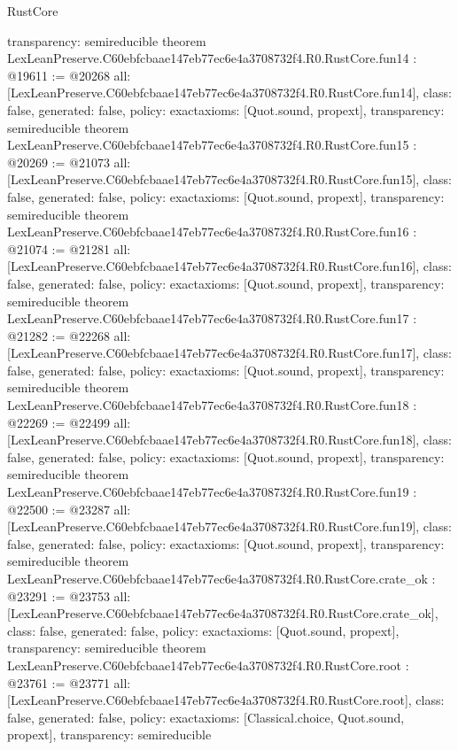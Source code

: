 \begin{lexlean}{RustCore}
\begin{coremodule}
{  transparency: semireducible
}
theorem LexLeanPreserve.C60ebfcbaae147eb77ec6e4a3708732f4.R0.RustCore.fun14 : @19611 := @20268 {
  all: [LexLeanPreserve.C60ebfcbaae147eb77ec6e4a3708732f4.R0.RustCore.fun14],
  class: false,
  generated: false,
  policy: exact{axioms: [Quot.sound, propext]},
  transparency: semireducible
}
theorem LexLeanPreserve.C60ebfcbaae147eb77ec6e4a3708732f4.R0.RustCore.fun15 : @20269 := @21073 {
  all: [LexLeanPreserve.C60ebfcbaae147eb77ec6e4a3708732f4.R0.RustCore.fun15],
  class: false,
  generated: false,
  policy: exact{axioms: [Quot.sound, propext]},
  transparency: semireducible
}
theorem LexLeanPreserve.C60ebfcbaae147eb77ec6e4a3708732f4.R0.RustCore.fun16 : @21074 := @21281 {
  all: [LexLeanPreserve.C60ebfcbaae147eb77ec6e4a3708732f4.R0.RustCore.fun16],
  class: false,
  generated: false,
  policy: exact{axioms: [Quot.sound, propext]},
  transparency: semireducible
}
theorem LexLeanPreserve.C60ebfcbaae147eb77ec6e4a3708732f4.R0.RustCore.fun17 : @21282 := @22268 {
  all: [LexLeanPreserve.C60ebfcbaae147eb77ec6e4a3708732f4.R0.RustCore.fun17],
  class: false,
  generated: false,
  policy: exact{axioms: [Quot.sound, propext]},
  transparency: semireducible
}
theorem LexLeanPreserve.C60ebfcbaae147eb77ec6e4a3708732f4.R0.RustCore.fun18 : @22269 := @22499 {
  all: [LexLeanPreserve.C60ebfcbaae147eb77ec6e4a3708732f4.R0.RustCore.fun18],
  class: false,
  generated: false,
  policy: exact{axioms: [Quot.sound, propext]},
  transparency: semireducible
}
theorem LexLeanPreserve.C60ebfcbaae147eb77ec6e4a3708732f4.R0.RustCore.fun19 : @22500 := @23287 {
  all: [LexLeanPreserve.C60ebfcbaae147eb77ec6e4a3708732f4.R0.RustCore.fun19],
  class: false,
  generated: false,
  policy: exact{axioms: [Quot.sound, propext]},
  transparency: semireducible
}
theorem LexLeanPreserve.C60ebfcbaae147eb77ec6e4a3708732f4.R0.RustCore.crate_ok : @23291 := @23753 {
  all: [LexLeanPreserve.C60ebfcbaae147eb77ec6e4a3708732f4.R0.RustCore.crate_ok],
  class: false,
  generated: false,
  policy: exact{axioms: [Quot.sound, propext]},
  transparency: semireducible
}
theorem LexLeanPreserve.C60ebfcbaae147eb77ec6e4a3708732f4.R0.RustCore.root : @23761 := @23771 {
  all: [LexLeanPreserve.C60ebfcbaae147eb77ec6e4a3708732f4.R0.RustCore.root],
  class: false,
  generated: false,
  policy: exact{axioms: [Classical.choice, Quot.sound, propext]},
  transparency: semireducible
}


\end{coremodule}
\end{lexlean}

